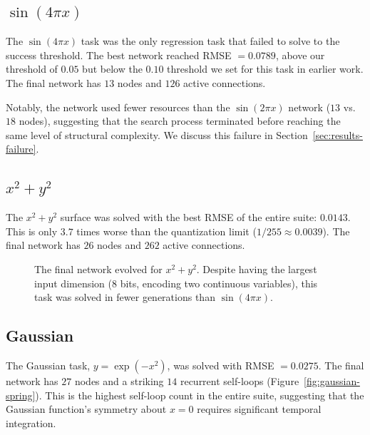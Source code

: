 \subsection{$\sin(4\pi x)$}
\label{sec:results-sin4pi}

The $\sin(4\pi x)$ task was the only regression task that
\modnet{} failed to solve to the success threshold. The best network
reached RMSE $= 0.0789$, above our threshold of $0.05$ but below the
$0.10$ threshold we set for this task in earlier work. The final
network has $13$ nodes and $126$ active connections.

Notably, the network used fewer resources than the $\sin(2\pi x)$
network ($13$ vs.\ $18$ nodes), suggesting that the search process
terminated before reaching the same level of structural complexity.
We discuss this failure in Section~\ref{sec:results-failure}.

\subsection{$x^2 + y^2$}
\label{sec:results-circle}

The $x^2 + y^2$ surface was solved with the best RMSE of the entire
suite: $0.0143$. This is only $3.7$ times worse than the quantization
limit ($1/255 \approx 0.0039$). The final network has $26$ nodes and
$262$ active connections.

\begin{figure}[h]
  \centering
  \caption{The final network evolved for $x^2 + y^2$. Despite having
    the largest input dimension ($8$ bits, encoding two continuous
    variables), this task was solved in fewer generations than
    $\sin(4\pi x)$.}
  \label{fig:circle-spring}
\end{figure}

\subsection{Gaussian}
\label{sec:results-gaussian}

The Gaussian task, $y = \exp(-x^2)$, was solved with RMSE $= 0.0275$.
The final network has $27$ nodes and a striking $14$ recurrent
self-loops (Figure~\ref{fig:gaussian-spring}). This is the highest
self-loop count in the entire suite, suggesting that the Gaussian
function's symmetry about $x = 0$ requires significant temporal
integration.

